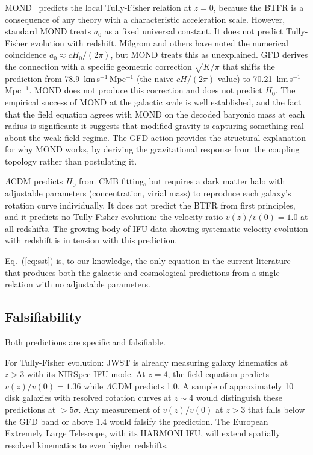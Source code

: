 \documentclass[a4paper,11pt]{article}
\begin{document}
MOND~\cite{milgrom1983} predicts the local Tully-Fisher relation at $z = 0$, because the BTFR is a consequence of any theory with a characteristic acceleration scale. However, standard MOND treats $a_0$ as a fixed universal constant. It does not predict Tully-Fisher evolution with redshift. Milgrom and others have noted the numerical coincidence $a_0 \approx cH_0/(2\pi)$, but MOND treats this as unexplained. GFD derives the connection with a specific geometric correction $\sqrt{K/\pi}$ that shifts the prediction from 78.9~km\,s$^{-1}$\,Mpc$^{-1}$ (the naive $cH/(2\pi)$ value) to 70.21~km\,s$^{-1}$\,Mpc$^{-1}$. MOND does not produce this correction and does not predict $H_0$. The empirical success of MOND at the galactic scale is well established, and the fact that the field equation agrees with MOND on the decoded baryonic mass at each radius is significant: it suggests that modified gravity is capturing something real about the weak-field regime. The GFD action provides the structural explanation for why MOND works, by deriving the gravitational response from the coupling topology rather than postulating it.

$\Lambda$CDM predicts $H_0$ from CMB fitting, but requires a dark matter halo with adjustable parameters (concentration, virial mass) to reproduce each galaxy's rotation curve individually. It does not predict the BTFR from first principles, and it predicts no Tully-Fisher evolution: the velocity ratio $v(z)/v(0) = 1.0$ at all redshifts. The growing body of IFU data showing systematic velocity evolution with redshift is in tension with this prediction.

Eq.~(\ref{eq:sst}) is, to our knowledge, the only equation in the current literature that produces both the galactic and cosmological predictions from a single relation with no adjustable parameters.

\subsection{Falsifiability}

Both predictions are specific and falsifiable.

For Tully-Fisher evolution: JWST is already measuring galaxy kinematics at $z > 3$ with its NIRSpec IFU mode. At $z = 4$, the field equation predicts $v(z)/v(0) = 1.36$ while $\Lambda$CDM predicts 1.0. A sample of approximately 10 disk galaxies with resolved rotation curves at $z \sim 4$ would distinguish these predictions at $> 5\sigma$. Any measurement of $v(z)/v(0)$ at $z > 3$ that falls below the GFD band or above 1.4 would falsify the prediction. The European Extremely Large Telescope, with its HARMONI IFU, will extend spatially resolved kinematics to even higher redshifts.
\end{document}
